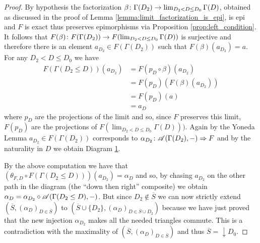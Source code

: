 \begin{proof}
  By hypothesis the factorization \(\beta\colon \Gamma(D_2)\to \lim_{D_2<D\leq D_0}\Gamma(D)\), obtained as discussed in the proof of Lemma \ref{lemma:limit_factorization_is_epi}, is epi and \(F\) is exact thus preserves epimorphisms via Proposition \ref{prop:left_condition}. It follows that \(F(\beta)\colon F(\Gamma(D_2))\to F(\lim_{D_2<D\leq D_0}\Gamma(D))\) is surjective and therefore there is an element \(a_{D_2}\in F(\Gamma(D_2))\) such that \(F(\beta)(a_{D_2}) = a\). For any \(D_2<D\leq D_0\) we have
  \begin{align*}
    F(\Gamma(D_2\leq D))(a_{D_2}) &= F(p_D\circ\beta)(a_{D_2})\\
                                  &= F(p_D)(F(\beta)(a_{D_2}))\\
                                  &= F(p_D)(a)\\
                                  &= a_D
  \end{align*}
  where \(p_D\) are the projections of the limit and so, since \(F\) preserves this limit, \(F(p_D)\) are the projections of \(F(\lim_{D_2<D\leq D_0}\Gamma(D)))\). Again by the Yoneda Lemma \(a_{D_2}\in F(\Gamma(D_2))\) corresponds to \(\alpha_{D_2}\colon {\mathscr A}(\Gamma(D_2),-)\Rightarrow F\) and by the naturality in \(D\) we obtain Diagram \ref{diagram:y2}.
    \begin{figure}[h]
    \begin{center}
    \end{center}
    \caption{}
    \label{diagram:y2}
  \end{figure}
  By the above computation we have that \((\theta_{F, D}\circ F(\Gamma(D_2\leq D)))(a_{D_2}) = \alpha_D\) and so, by chasing \(a_{D_2}\) on the other path in the diagram (the ``down then right'' composite) we obtain \(\alpha_D = \alpha_{D_2}\circ{\mathscr A}(\Gamma(D_2\leq D),-)\). But since \(D_2\not\in\overline{S}\) we can now strictly extend \((\overline{S}, (\alpha_D)_{D\in\overline{S}})\) to \((\overline{S}\cup\{D_2\}, (\alpha_D)_{D\in\overline{S}\cup D_2})\) because we have just proved that the new injection \(\alpha_{D_2}\) makes all the needed triangles commute. This is a contradiction with the maximality of \((\overline{S}, (\alpha_D)_{D\in\overline{S}})\) and thus \(\overline{S}=\downarrow D_0\).
\end{proof}

